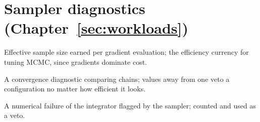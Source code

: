 \section*{Sampler diagnostics (Chapter~\ref{sec:workloads})}

\begin{description}[leftmargin=1.5em, itemsep=1pt, font=\normalfont\bfseries]
\item[ESS per gradient] Effective sample size earned per gradient
evaluation; the efficiency currency for tuning MCMC, since gradients
dominate cost.
\item[$\widehat{R}$ (potential scale reduction)] A convergence
diagnostic comparing chains; values away from one veto a
configuration no matter how efficient it looks.
\item[divergence (HMC)] A numerical failure of the integrator flagged
by the sampler; counted and used as a veto.
\end{description}
